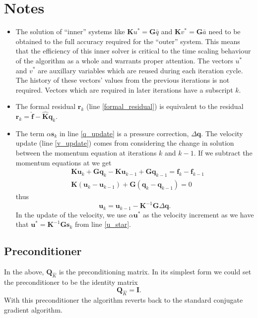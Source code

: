 \documentclass[a4paper]{article}
\newcommand{\bs}[1]{\boldsymbol{#1}}				%
\newcommand{\pc}{\mbox{${\boldsymbol Q}_{\hat K}$}}	%
\begin{document}
\section{Notes}
\begin{itemize}
	\item The solution of ``inner'' systems like ${\boldsymbol K} u^* = {\boldsymbol G} \bar q$ and ${\boldsymbol K} v^* = {\boldsymbol G} \bar a$ need to be obtained to the full accuracy required for the ``outer'' system. This means that the efficiency of this inner solver is critical to the time scaling behaviour of the algorithm as a whole and warrants proper attention. 	
The vectors $u^*$ and $v^*$
are auxillary variables which are reused during each iteration cycle. The history of these vectors' values from the previous iterations is not required. Vectors which are required in later iterations have a subscript $k$. 
	\item The formal residual $\bs r_{k}$ (line \ref{formal_residual}) is equivalent to the residual $\bs r_{k} = \widehat{\bs f} - \widehat{\bs K} \bs q_{k}$.   %
	\item The term $\alpha {\bs s}_k$ in line \ref{q_update} is a pressure correction, $\Delta \bs q$. The velocity update (line \ref{v_update}) comes from considering the change in solution between the momentum equation at iterations
	$k$ and $k-1$. If we subtract the momentum equations at we get
	\begin{align}
		&\bs K \bs u_k + \bs G \bs q_k - \bs K \bs u_{k-1} + \bs G \bs q_{k-1} = \bs f_k - \bs f_{k-1}	\\
		&\bs K \left( \bs u_k - \bs u_{k-1} \right) + \bs G \left( \bs q_k - \bs q_{k-1} \right) = 0 
	\end{align}
	thus
	$$
		\bs u_k = \bs u_{k-1} - \bs K^{-1} \bs G \Delta \bs q.
	$$
	In the update of the velocity, we use $\alpha {\boldsymbol u}^*$ as the velocity increment as we have that ${\boldsymbol u}^* = {\boldsymbol K} ^{-1}{\boldsymbol G}{\boldsymbol s}_k$ from line \ref{u_star}.
\end{itemize}



\subsection{Preconditioner}
In the above, $\pc$ is the preconditioning matrix. In its simplest form we could set the preconditioner to be the identity matrix
\begin{equation*}
	\pc = {\boldsymbol I }.
\end{equation*}
With this preconditioner the algorithm reverts back to the standard conjugate gradient algorithm.
\end{document}
